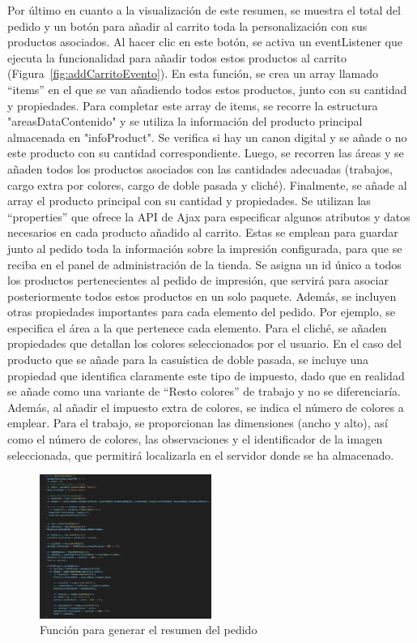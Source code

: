 \documentclass[12pt]{article}
\begin{document}
Por último en cuanto a la visualización de este resumen, se muestra el total del pedido y un botón para añadir al carrito toda la personalización 
con sus productos asociados. Al hacer clic en este botón, se activa un eventListener que ejecuta la funcionalidad para añadir todos estos 
productos al carrito (Figura~\ref{fig:addCarritoEvento}). En esta función, se crea un array llamado ``items'' en el que se van añadiendo todos estos productos, junto con su cantidad 
y propiedades. Para completar este array de items, se recorre la estructura "areasDataContenido" y se utiliza la información del producto principal 
almacenada en "infoProduct". Se verifica si hay un canon digital y se añade o no este producto con su cantidad correspondiente. Luego, se recorren las
áreas y se añaden todos los productos asociados con las cantidades adecuadas (trabajos, cargo extra por colores, cargo de doble pasada y cliché). 
Finalmente, se añade al array el producto principal con su cantidad y propiedades. Se utilizan las ``properties'' que ofrece la API de Ajax para especificar 
algunos atributos y datos necesarios en cada producto añadido al carrito. Estas se emplean para guardar junto al pedido toda la información sobre la impresión 
configurada, para que se reciba en el panel de administración de la tienda. Se asigna un id único a todos los productos pertenecientes 
al pedido de impresión, que servirá para asociar posteriormente todos estos productos en un solo paquete. Además, se incluyen otras propiedades importantes
para cada elemento del pedido. Por ejemplo, se especifica el área a la que pertenece cada elemento. Para el cliché, se añaden 
propiedades que detallan los colores seleccionados por el usuario. En el caso del producto que se añade para la casuística de doble pasada, se incluye una
propiedad que identifica claramente este tipo de impuesto, dado que en realidad se añade como una variante de ``Resto colores'' de trabajo y no se diferenciaría. Además, 
al añadir el impuesto extra de colores, se indica el número de colores a emplear. Para el trabajo, se proporcionan las dimensiones (ancho y alto), 
así como el número de colores, las observaciones y el identificador de la imagen seleccionada, que permitirá localizarla en el servidor donde se ha almacenado.

\begin{figure}[ht]
    \centering
    \includegraphics[width=0.5\textwidth]{imagenesUS3-modal/generarResumen.png}
    \caption{\label{fig:resumen1} Función para generar el resumen del pedido}
    \vspace{\fill}
\end{figure}
\end{document}
